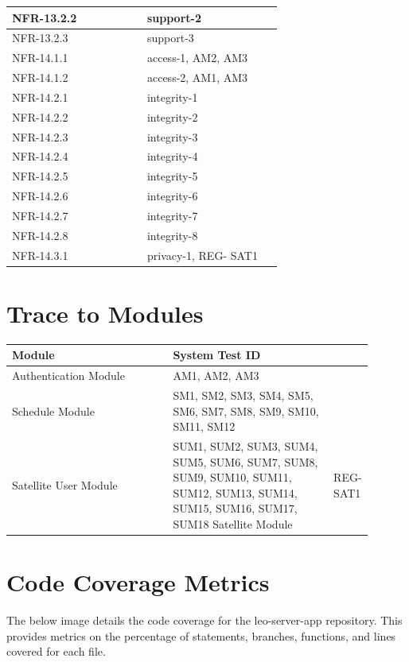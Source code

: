 \documentclass[12pt, titlepage]{article}
\begin{document}
\begin{longtable}{|p{0.45\linewidth}|p{0.45\linewidth}|}
\hline
NFR-13.2.2 & support-2 \\
\hline
NFR-13.2.3 & support-3 \\
\hline
NFR-14.1.1 & access-1, AM2, AM3 \\
\hline
NFR-14.1.2 & access-2, AM1, AM3 \\
\hline
NFR-14.2.1 & integrity-1 \\
\hline
NFR-14.2.2 & integrity-2 \\
\hline
NFR-14.2.3 & integrity-3 \\
\hline
NFR-14.2.4 & integrity-4 \\
\hline
NFR-14.2.5 & integrity-5 \\
\hline
NFR-14.2.6 & integrity-6 \\
\hline
NFR-14.2.7 & integrity-7 \\
\hline
NFR-14.2.8 & integrity-8 \\
\hline
NFR-14.3.1 & privacy-1, REG-
SAT1 \\
\hline
\end{longtable}


\section{Trace to Modules}	

\begin{longtable}{|p{0.45\linewidth}|p{0.45\linewidth}|}
\hline
\textbf{Module} & \textbf{System Test ID} \\
\hline
Authentication Module & AM1, AM2, AM3 \\
\hline
Schedule Module & SM1, SM2, SM3, SM4, SM5, SM6, SM7, SM8, SM9, SM10, SM11, SM12 \\
\hline
Satellite User Module & SUM1, SUM2, SUM3, SUM4, SUM5, SUM6, SUM7, SUM8, SUM9, SUM10, SUM11, SUM12, SUM13, SUM14, SUM15, SUM16, SUM17, SUM18
\hline
Satellite Module & REG-SAT1 \\
\hline
\end{longtable}
\newpage
\section{Code Coverage Metrics}

The below image details the code coverage for the leo-server-app repository. This provides metrics on the percentage of statements, branches, functions, and lines covered for each file.
\end{document}
